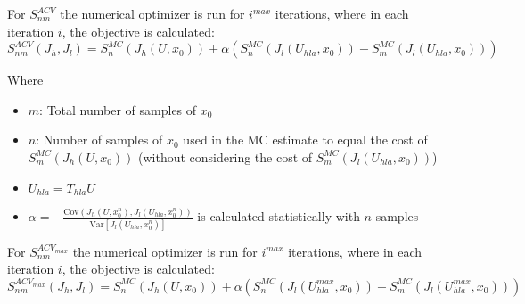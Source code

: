 \documentclass{article}
\begin{document}


For $S_{nm}^{ACV}$ the numerical optimizer is run for $i^{max}$ iterations, where in each iteration $i$, the objective is calculated:
\begin{equation}
  S_{nm}^{ACV}(J_h, J_l) = S_n^{MC}(J_h(U, x_0)) + \alpha (S_n^{MC}(J_l(U_{hla}, x_0)) - S_m^{MC}(J_l(U_{hla}, x_0)))
\end{equation}

Where
\begin{itemize}
  \item $m$: Total number of samples of $x_0$
  \item $n$: Number of samples of $x_0$ used in the MC estimate to equal the cost of $S_m^{MC}(J_h(U, x_0))$ (without considering the cost of $S_m^{MC}(J_l(U_{hla}, x_0))$)
  \item $U_{hla} = T_{hla} U$
  \item $\alpha = -\frac{\text{Cov}(J_h(U, x_0^n), J_l(U_{hla}, x_0^n))}{\text{Var}[J_l(U_{hla}, x_0^n)]}$ is calculated statistically with $n$ samples
\end{itemize}

For $S_{nm}^{ACV_{max}}$ the numerical optimizer is run for $i^{max}$ iterations, where in each iteration $i$, the objective is calculated:
\begin{equation}
  S_{nm}^{ACV_{max}}(J_h, J_l) = S_n^{MC}(J_h(U, x_0)) + \alpha (S_n^{MC}(J_l(U_{hla}^{max}, x_0)) - S_m^{MC}(J_l(U_{hla}^{max}, x_0)))
\end{equation}
\end{document}
